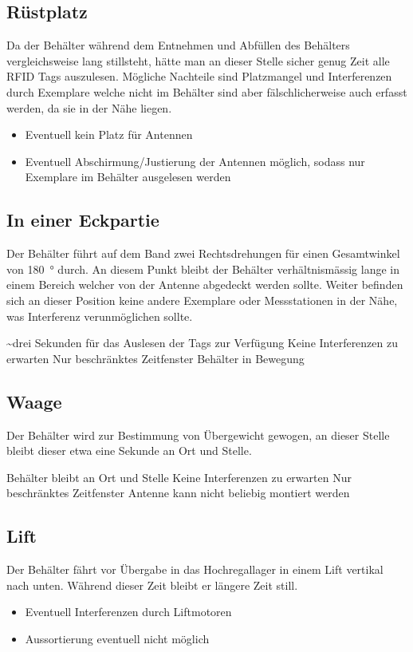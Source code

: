 \subsection{Rüstplatz}
Da der Behälter während dem Entnehmen und Abfüllen des Behälters vergleichsweise lang stillsteht, hätte man an dieser Stelle sicher genug Zeit alle RFID Tags auszulesen. Mögliche Nachteile sind Platzmangel und Interferenzen durch Exemplare welche nicht im Behälter sind aber fälschlicherweise auch erfasst werden, da sie in der Nähe liegen.
\begin{itemize}
	\pro Genügend Zeit für das Auslesen aller Tags
	\pro Früh im Prozess für eine Meldung
	\con Interferenzen durch RFID markierte Exemplare in der Nähe
	\item Eventuell kein Platz für Antennen
	\item Eventuell Abschirmung/Justierung der Antennen möglich, sodass nur Exemplare im Behälter ausgelesen werden
\end{itemize}

\subsection{In einer Eckpartie}
Der Behälter führt auf dem Band zwei Rechtsdrehungen für einen Gesamtwinkel von \SI{180}{\degree} durch. An diesem Punkt bleibt der Behälter verhältnismässig lange in einem Bereich welcher von der Antenne abgedeckt werden sollte. Weiter befinden sich an dieser Position keine andere Exemplare oder Messstationen in der Nähe, was Interferenz verunmöglichen sollte.
\begin{itemize}
	\pro \textasciitilde drei Sekunden für das Auslesen der Tags zur Verfügung
	\pro Keine Interferenzen zu erwarten
	\con Nur beschränktes Zeitfenster
	\con Behälter in Bewegung
\end{itemize}

\subsection{Waage}
Der Behälter wird zur Bestimmung von Übergewicht gewogen, an dieser Stelle bleibt dieser etwa eine Sekunde an Ort und Stelle.
\begin{itemize}
	\pro Behälter bleibt an Ort und Stelle
	\pro Keine Interferenzen zu erwarten
	\con Nur beschränktes Zeitfenster
	\con Antenne kann nicht beliebig montiert werden
\end{itemize}

\subsection{Lift}
Der Behälter fährt vor Übergabe in das Hochregallager in einem Lift vertikal nach unten. Während dieser Zeit bleibt er längere Zeit still.
\begin{itemize}
	\pro Behälter bleibt an Ort und Stelle
	\pro Grosses Zeitfenster
	\con Beschränkter Platz da Lift
	\con Spät im Prozess
	\item Eventuell Interferenzen durch Liftmotoren
	\item Aussortierung eventuell nicht möglich
\end{itemize}

